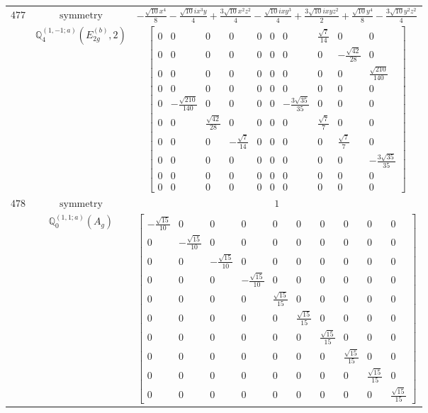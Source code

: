 \documentclass[fleqn,8pt,landscape]{jsarticle}
\begin{document}
\begin{longtable}{ccc}
$ 477 $ & $ \text{symmetry} $ & $ - \frac{\sqrt{10} x^{4}}{8} - \frac{\sqrt{10} i x^{3} y}{4} + \frac{3 \sqrt{10} x^{2} z^{2}}{4} - \frac{\sqrt{10} i x y^{3}}{4} + \frac{3 \sqrt{10} i x y z^{2}}{2} + \frac{\sqrt{10} y^{4}}{8} - \frac{3 \sqrt{10} y^{2} z^{2}}{4} $ \\
$  $ & $ \mathbb{Q}_{4}^{(1,-1;a)}(E_{2g}^{(b)},2) $ & $ \begin{bmatrix} 0 & 0 & 0 & 0 & 0 & 0 & 0 & \frac{\sqrt{7}}{14} & 0 & 0 \\ 0 & 0 & 0 & 0 & 0 & 0 & 0 & 0 & - \frac{\sqrt{42}}{28} & 0 \\ 0 & 0 & 0 & 0 & 0 & 0 & 0 & 0 & 0 & \frac{\sqrt{210}}{140} \\ 0 & 0 & 0 & 0 & 0 & 0 & 0 & 0 & 0 & 0 \\ 0 & - \frac{\sqrt{210}}{140} & 0 & 0 & 0 & 0 & - \frac{3 \sqrt{35}}{35} & 0 & 0 & 0 \\ 0 & 0 & \frac{\sqrt{42}}{28} & 0 & 0 & 0 & 0 & \frac{\sqrt{7}}{7} & 0 & 0 \\ 0 & 0 & 0 & - \frac{\sqrt{7}}{14} & 0 & 0 & 0 & 0 & \frac{\sqrt{7}}{7} & 0 \\ 0 & 0 & 0 & 0 & 0 & 0 & 0 & 0 & 0 & - \frac{3 \sqrt{35}}{35} \\ 0 & 0 & 0 & 0 & 0 & 0 & 0 & 0 & 0 & 0 \\ 0 & 0 & 0 & 0 & 0 & 0 & 0 & 0 & 0 & 0 \end{bmatrix} $ \\ \hline
$ 478 $ & $ \text{symmetry} $ & $ 1 $ \\
$  $ & $ \mathbb{Q}_{0}^{(1,1;a)}(A_{g}) $ & $ \begin{bmatrix} - \frac{\sqrt{15}}{10} & 0 & 0 & 0 & 0 & 0 & 0 & 0 & 0 & 0 \\ 0 & - \frac{\sqrt{15}}{10} & 0 & 0 & 0 & 0 & 0 & 0 & 0 & 0 \\ 0 & 0 & - \frac{\sqrt{15}}{10} & 0 & 0 & 0 & 0 & 0 & 0 & 0 \\ 0 & 0 & 0 & - \frac{\sqrt{15}}{10} & 0 & 0 & 0 & 0 & 0 & 0 \\ 0 & 0 & 0 & 0 & \frac{\sqrt{15}}{15} & 0 & 0 & 0 & 0 & 0 \\ 0 & 0 & 0 & 0 & 0 & \frac{\sqrt{15}}{15} & 0 & 0 & 0 & 0 \\ 0 & 0 & 0 & 0 & 0 & 0 & \frac{\sqrt{15}}{15} & 0 & 0 & 0 \\ 0 & 0 & 0 & 0 & 0 & 0 & 0 & \frac{\sqrt{15}}{15} & 0 & 0 \\ 0 & 0 & 0 & 0 & 0 & 0 & 0 & 0 & \frac{\sqrt{15}}{15} & 0 \\ 0 & 0 & 0 & 0 & 0 & 0 & 0 & 0 & 0 & \frac{\sqrt{15}}{15} \end{bmatrix} $ \\ \hline

\end{longtable}
\end{document}
